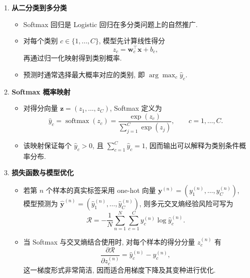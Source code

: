 \documentclass{../nndlcourse}
\begin{document}
\begin{enumerate}
    \item \textbf{从二分类到多分类}
    \begin{itemize}
        \item Softmax 回归是 Logistic 回归在多分类问题上的自然推广.
        \item 对每个类别 $c \in \{1, \dots, C\}$, 模型先计算线性得分
        \begin{equation*}
            z_c = \boldsymbol{w}_c^\top \boldsymbol{x} + b_c,
        \end{equation*}
        再通过归一化映射得到类别概率.
        \item 预测时通常选择最大概率对应的类别, 即 $\arg\max_c \hat{y}_c$.
    \end{itemize}
    \item \textbf{Softmax 概率映射}
    \begin{itemize}
        \item 对得分向量 $\boldsymbol{z} = (z_1, \dots, z_C)$, Softmax 定义为
        \begin{equation*}
            \hat{y}_c = \operatorname{softmax}(z_c) = \frac{\exp(z_c)}{\sum_{j=1}^C \exp(z_j)}, \qquad c = 1, \dots, C.
        \end{equation*}
        \item 该映射保证每个 $\hat{y}_c > 0$, 且 $\sum_{c=1}^C \hat{y}_c = 1$, 因而输出可以解释为类别条件概率分布.
    \end{itemize}
    \item \textbf{损失函数与模型优化}
    \begin{itemize}
        \item 若第 $n$ 个样本的真实标签采用 one-hot 向量 $\boldsymbol{y}^{(n)} = (y_1^{(n)}, \dots, y_C^{(n)})$, 模型预测为 $\hat{\boldsymbol{y}}^{(n)} = (\hat{y}_1^{(n)}, \dots, \hat{y}_C^{(n)})$, 则多元交叉熵经验风险可写为
        \begin{equation*}
            \mathcal{R} = -\frac{1}{N} \sum_{n=1}^N \sum_{c=1}^C y_c^{(n)} \log \hat{y}_c^{(n)}.
        \end{equation*}
        \item 当 Softmax 与交叉熵结合使用时, 对每个样本的得分分量 $z_c^{(n)}$ 有
        \begin{equation*}
            \frac{\partial \mathcal{R}}{\partial z_c^{(n)}} = \hat{y}_c^{(n)} - y_c^{(n)},
        \end{equation*}
        这一梯度形式非常简洁, 因而适合用梯度下降及其变种进行优化.
    \end{itemize}
\end{enumerate}
\end{document}

